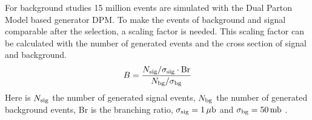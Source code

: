 For background studies 15 million events are simulated with the Dual Parton Model based generator DPM.
To make the events of background and signal comparable after the selection, a scaling factor is needed.
This scaling factor can be calculated with the number of generated events and the cross section of signal and background.
\begin{equation}
		B = \frac{N_{\textnormal{sig}}/\sigma_{\textnormal{sig}} \cdot \textnormal{Br}}{N_{\textnormal{bg}}/\sigma_{\textnormal{bg}}}
\label{eq:bg_scaling}
\end{equation}
Here is $N_{\textnormal{sig}}$ the number of generated signal events, $N_{\textnormal{bg}}$ the number of generated background events, Br is the branching ratio, $\sigma_{\textnormal{sig}} = 1\,\mu\textnormal{b}$ and $\sigma_{\textnormal{bg}} = 50\, \textnormal{mb}$ \cite{PANDAphysics2009}.
